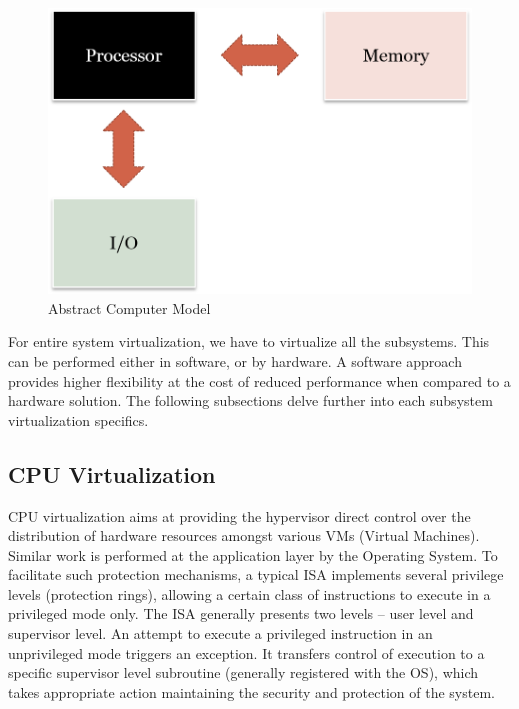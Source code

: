 \setlength{\belowcaptionskip}{-10pt}

\begin{figure}[H]
  \centering
  \includegraphics[scale=0.8]{figures/Mem_IO_CPU.png}
  \caption{Abstract Computer Model}
  \label{fig:mem_io}
\end{figure}
For entire system virtualization, we have to virtualize all the subsystems. This can be performed either in software, or by hardware. A software approach provides higher flexibility at the cost of reduced performance when compared to a hardware solution. The following subsections delve further into each subsystem virtualization specifics.

\subsection{CPU Virtualization}
CPU virtualization aims at providing the hypervisor direct control over the distribution of hardware resources amongst various VMs (Virtual Machines). Similar work is performed at the application layer by the Operating System. To facilitate such protection mechanisms, a typical ISA implements several privilege levels (protection rings), allowing a certain class of instructions to execute in a privileged mode only. The ISA generally presents two levels -- user level and supervisor level. An attempt to execute a privileged instruction in an unprivileged mode triggers an exception. It transfers control of execution to a specific supervisor level subroutine (generally registered with the OS), which takes appropriate action maintaining the security and protection of the system.

\setlength{\belowcaptionskip}{-10pt}

